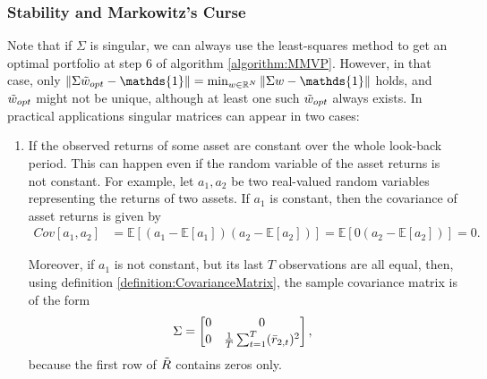     \subsubsection{Stability and Markowitz's Curse}\label{section:MarkowitzsCurse}
        Note that if $\Sigma$ is singular, we can always use the least-squares method to get an optimal portfolio at step 6 of algorithm \ref{algorithm:MMVP}. However, in that case, only $\| \Sigma \Tilde{w}_{opt} - \mathds{1} \| = \min_{w \in \mathbb{R}^N} \| \Sigma w - \mathds{1} \|$ holds, and $\Tilde{w}_{opt}$ might not be unique, although at least one such $\Tilde{w}_{opt}$ always exists. In practical applications singular matrices can appear in two cases:
    	\begin{enumerate}
    	    \item If the observed returns of some asset are constant over the whole look-back period. This can happen even if the random variable of the asset returns is not constant. For example, let $a_1, a_2$ be two real-valued random variables representing the returns of two assets. If $a_1$ is constant, then the covariance of asset returns is given by
    	    \begin{align*}
    	        Cov[a_1, a_2] &= \mathbb{E}[(a_1 - \mathbb{E}[a_1]) (a_2 - \mathbb{E}[a_2])] = \mathbb{E}[0 (a_2 - \mathbb{E}[a_2])] = 0.
    	    \end{align*}
    	    
    	    Moreover, if $a_1$ is not constant, but its last $T$ observations are all equal, then, using definition \ref{definition:CovarianceMatrix}, the sample covariance matrix is of the form
    	    \begin{align*}
    	        \Sigma = \begin{bmatrix}
    	            0 & 0 \\
    	            0 & \frac{1}{T} \sum_{t=1}^T (\Bar{r}_{2,t})^2
    	        \end{bmatrix},
    	    \end{align*}
    	    because the first row of $\Tilde{R}$ contains zeros only.
    	    

\end{enumerate}
